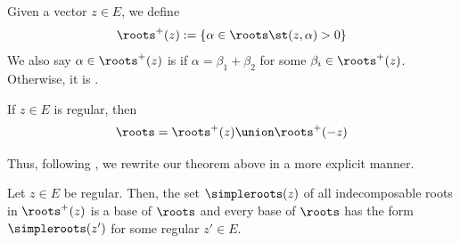 \documentclass[11pt,leqno,oneside]{amsart}
\numberwithin{thm}{section}
\begin{document}
\begin{defn}
  Given a vector \(z \in E\), we define \[
    \roots^+(z) := \{\alpha \in \roots \st (z,\alpha) > 0\}
  \]
  We also say \(\alpha \in \roots^+(z)\) is  if
  \(\alpha = \beta_1 + \beta_2\)  for some \(\beta_i \in
  \roots^+(z)\). Otherwise, it is .
\end{defn}
\begin{prop}
  If \(z \in E\) is regular, then \[
    \roots = \roots^+(z) \union \roots^+(-z)
  \]
\end{prop}
Thus, following \cite{humph}, we rewrite our theorem above in a more
explicit manner.
\begin{thm}\label{regular-vec-and-base}
  Let \(z \in E\) be regular. Then, the set \(\simpleroots(z)\) of all
  indecomposable 
  roots in \(\roots^+(z)\) is a base of \(\roots\) and every base of
  \(\roots\) has the form \(\simpleroots(z')\) for some regular \(z'
  \in E\).
\end{thm}
\end{document}
